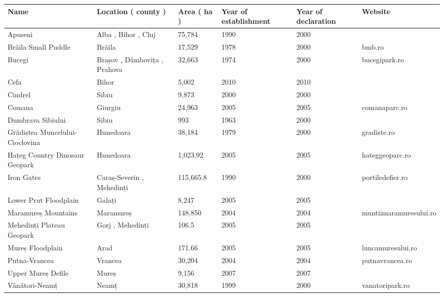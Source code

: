 \documentclass{article}
\begin{document}
\begin{tabular}{llllll}
\toprule
Name & Location ( county ) & Area ( ha ) & Year of establishment & Year of declaration & Website \\
\midrule
Apuseni & Alba , Bihor , Cluj & 75,784 & 1990 & 2000 &  \\
Brăila Small Puddle & Brăila & 17,529 & 1978 & 2000 & bmb.ro \\
Bucegi & Brașov , Dâmbovița , Prahova & 32,663 & 1974 & 2000 & bucegipark.ro \\
Cefa & Bihor & 5,002 & 2010 & 2010 &  \\
Cindrel & Sibiu & 9,873 & 2000 & 2000 &  \\
Comana & Giurgiu & 24,963 & 2005 & 2005 & comanaparc.ro \\
Dumbrava Sibiului & Sibiu & 993 & 1963 & 2000 &  \\
Grădiștea Muncelului-Cioclovina & Hunedoara & 38,184 & 1979 & 2000 & gradiste.ro \\
Hațeg Country Dinosaur Geopark & Hunedoara & 1,023.92 & 2005 & 2005 & hateggeoparc.ro \\
Iron Gates & Caraș-Severin , Mehedinți & 115,665.8 & 1990 & 2000 & portiledefier.ro \\
Lower Prut Floodplain & Galați & 8,247 & 2005 & 2005 &  \\
Maramureș Mountains & Maramureș & 148,850 & 2004 & 2004 & muntiimaramuresului.ro \\
Mehedinți Plateau Geopark & Gorj , Mehedinți & 106.5 & 2005 & 2005 &  \\
Mureș Floodplain & Arad & 171.66 & 2005 & 2005 & luncamuresului.ro \\
Putna-Vrancea & Vrancea & 30,204 & 2004 & 2004 & putnavrancea.ro \\
Upper Mureș Defile & Mureș & 9,156 & 2007 & 2007 &  \\
Vânători-Neamț & Neamț & 30,818 & 1999 & 2000 & vanatoripark.ro \\
\bottomrule
\end{tabular}
\end{document}
